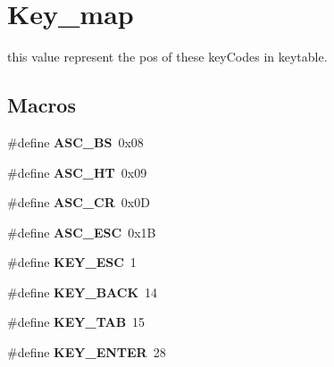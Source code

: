 \hypertarget{group__key__map}{}\section{Key\+\_\+map}
\label{group__key__map}


this value represent the pos of these key\+Codes in keytable.  


\subsection*{Macros}
\begin{DoxyCompactItemize}
\item 
\hypertarget{group__key__map_ga9964fd955b9f6bc9833543be52746384}{}\#define {\bfseries A\+S\+C\+\_\+\+B\+S}~0x08\label{group__key__map_ga9964fd955b9f6bc9833543be52746384}

\item 
\hypertarget{group__key__map_ga5329aa2948899da5280d4c204642ad1f}{}\#define {\bfseries A\+S\+C\+\_\+\+H\+T}~0x09\label{group__key__map_ga5329aa2948899da5280d4c204642ad1f}

\item 
\hypertarget{group__key__map_ga0d658c42d5c24c209ad205b3acb20731}{}\#define {\bfseries A\+S\+C\+\_\+\+C\+R}~0x0\+D\label{group__key__map_ga0d658c42d5c24c209ad205b3acb20731}

\item 
\hypertarget{group__key__map_gac3bc5731da8a0be2fe50148f69a7b890}{}\#define {\bfseries A\+S\+C\+\_\+\+E\+S\+C}~0x1\+B\label{group__key__map_gac3bc5731da8a0be2fe50148f69a7b890}

\item 
\hypertarget{group__key__map_ga86b2b2d4eda22067d85d2287c118e2d8}{}\#define {\bfseries K\+E\+Y\+\_\+\+E\+S\+C}~1\label{group__key__map_ga86b2b2d4eda22067d85d2287c118e2d8}

\item 
\hypertarget{group__key__map_gad79ba6770b2ab25b890f7819357a125d}{}\#define {\bfseries K\+E\+Y\+\_\+\+B\+A\+C\+K}~14\label{group__key__map_gad79ba6770b2ab25b890f7819357a125d}

\item 
\hypertarget{group__key__map_ga4fa9fbcc86d5ee884a821459a87f3a54}{}\#define {\bfseries K\+E\+Y\+\_\+\+T\+A\+B}~15\label{group__key__map_ga4fa9fbcc86d5ee884a821459a87f3a54}

\item 
\hypertarget{group__key__map_gabaee5edb96e542206ae6c8102ac228af}{}\#define {\bfseries K\+E\+Y\+\_\+\+E\+N\+T\+E\+R}~28\label{group__key__map_gabaee5edb96e542206ae6c8102ac228af}


\end{DoxyCompactItemize}
